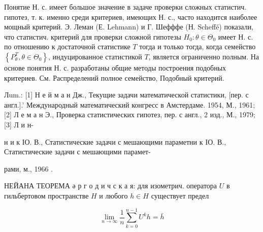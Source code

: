 \documentclass[10pt]{article}
\begin{document}
Понятие Н. с. имеет большое значение в задаче проверки сложных статистич. гипотез, т. к. именно среди критериев, имеющих Н. с., часто находится наиболее мощный критерий. Э. Леман (Е. Lehmann) и Г. Шефффе (Н. Scheffé) показали, что статистич. критерий для проверки сложной гипотезы $H_{0}: \theta \in \Theta_{0}$ имеет Н. с. по отношению к достаточной статистике $T$ тогда и только тогда, когда семейство $\left\{P_{\theta}^{T}, \theta \in \Theta_{0}\right\}$, индуцированное статистикой $T$, является ограниченно полным. На основе понятия Н. с. разработаны общие методы построения подобных критериев. См. Распределений полное семейство, Подобный критерий.



Лum.: [1] Н е й м а н Дж., Текущие задачи математической статистики, [пер. с англ.].' Международный математический конгресс в Амстердаме. 1954, М., 1961; [2] Л е м а н Э., Проверка статистических гипотез, пер. с англ., 2 изд., М., 1979; [3] Л и н-

н и к ІО. В., Статистические задачи с мешающими параметни к IО. В., Статистические задачи с мешающими парамет-

рами, м., 1966 .



НЕЙАНА ТЕОРЕМА ә р г о д и ч с к а я: для изометрич. оператора $U$ в гильбертовом пространстве $H$ и любого $h \in H$ существует предел



\[

\lim _{n \rightarrow \infty} \frac{1}{n} \sum_{k=0}^{n-1} U^{k} h=\bar{h}

\]
\end{document}
